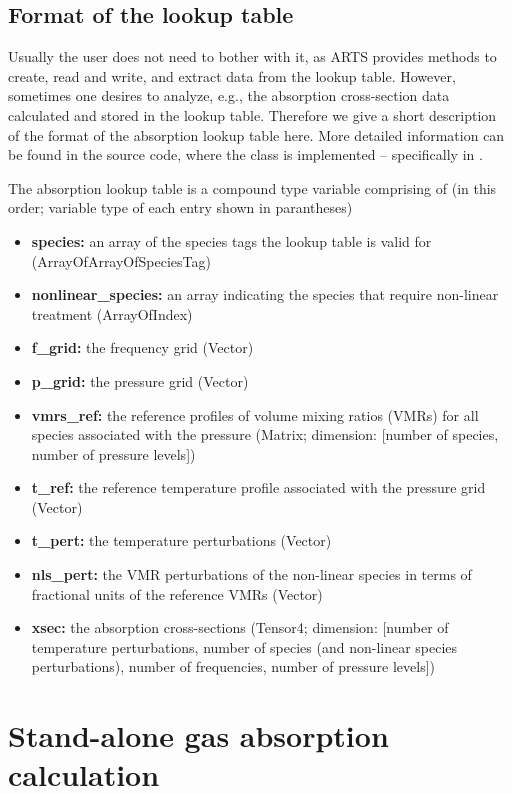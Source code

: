 \subsection{Format of the lookup table}
Usually the user does not need to bother with it, as ARTS provides methods to
create, read and write, and extract data from the lookup table. However,
sometimes one desires to analyze, e.g., the absorption cross-section data
calculated and stored in the lookup table. Therefore we give a short description
of the format of the absorption lookup table here. More detailed information can
be found in the source code, where the  class is
implemented -- specifically in .

The absorption lookup table is a compound type variable comprising of (in this
order; variable type of each entry shown in parantheses)
\begin{itemize}
\item \textbf{species:} an array of the species tags the lookup table is valid for
(ArrayOfArrayOfSpeciesTag)
\item \textbf{nonlinear\_species:} an array indicating the species that require non-linear treatment
(ArrayOfIndex)
\item \textbf{f\_grid:} the frequency grid (Vector)
\item \textbf{p\_grid:} the pressure grid (Vector)
\item \textbf{vmrs\_ref:} the reference profiles of volume mixing ratios (VMRs) for all species
associated with the pressure (Matrix; dimension: [number of species, number of
pressure levels])
\item \textbf{t\_ref:} the reference temperature profile associated with the
pressure grid (Vector)
\item \textbf{t\_pert:} the temperature perturbations (Vector)
\item \textbf{nls\_pert:} the VMR perturbations of the non-linear species in
terms of fractional units of the reference VMRs (Vector)
\item \textbf{xsec:} the absorption cross-sections (Tensor4; dimension: [number
of temperature perturbations, number of species (and non-linear species
perturbations), number of frequencies, number of pressure levels])
\end{itemize}

\section{Stand-alone gas absorption calculation}
\label{sec:absorption:abs-only}

